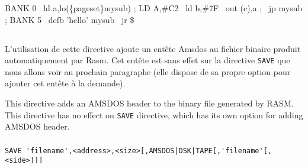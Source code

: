 \begin{code}
BANK 0
\  ld a,lo(\{pageset\}mysub) ; LD A,\#C2
\  ld b,\#7F
\  out (c),a           ; 
\  jp mysub            ; 
\medskip
BANK 5
\  defb 'hello'
mysub
\  jr \$
\end{code}

\subsection{}

\subsubsection{}

\begin{xfr}
L'utilisation de cette directive ajoute un entête Amsdos au fichier binaire produit automatiquement par Rasm. Cet entête est sans effet sur la directive \texttt{SAVE} que nous allons voir au prochain paragraphe (elle dispose de sa propre option pour ajouter cet entête à la demande).
\end{xfr}

\begin{xen}
This directive adds an AMSDOS header to the binary file generated by RASM.
This directive has no effect on \texttt{SAVE} directive, which has its own option for adding AMSDOS header.
\end{xen}

\subsubsection{}

\begin{verbatim}
SAVE 'filename',<address>,<size>[,AMSDOS|DSK|TAPE[,'filename'[,<side>]]]
\end{verbatim}

